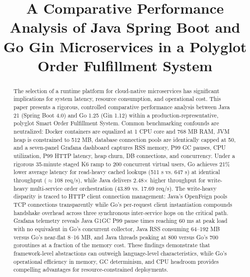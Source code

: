 \documentclass[conference]{IEEEtran}
\begin{document}
\title{A Comparative Performance Analysis of Java Spring Boot and Go Gin Microservices in a Polyglot Order Fulfillment System}

\author{
\and
{}
}

\maketitle

\begin{abstract}
The selection of a runtime platform for cloud-native microservices has significant implications for system latency, resource consumption, and operational cost. This paper presents a rigorous, controlled comparative performance analysis between Java 21 (Spring Boot 4.0) and Go 1.25 (Gin 1.12) within a production-representative, polyglot Smart Order Fulfillment System. Common benchmarking confounds are neutralized: Docker containers are equalized at 1 CPU core and 768 MB RAM, JVM heap is constrained to 512 MB, database connection pools are identically capped at 50, and a seven-panel Grafana dashboard captures RSS memory, P99 GC pauses, CPU utilization, P99 HTTP latency, heap churn, DB connections, and concurrency. Under a rigorous 35-minute staged K6 ramp to 200 concurrent virtual users, Go achieves 21\% lower average latency for read-heavy cached lookups (511 \textmu s vs. 647 \textmu s) at identical throughput ($\approx$108 req/s), while Java delivers 2.48$\times$ higher throughput for write-heavy multi-service order orchestration (43.89 vs. 17.69 req/s). The write-heavy disparity is traced to HTTP client connection management: Java's OpenFeign pools TCP connections transparently while Go's per-request client instantiation compounds handshake overhead across three synchronous inter-service hops on the critical path. Grafana telemetry reveals Java G1GC P99 pause times reaching 60 ms at peak load with no equivalent in Go's concurrent collector, Java RSS consuming 64--192 MB versus Go's near-flat 8--16 MB, and Java threads peaking at 800 versus Go's 700 goroutines at a fraction of the memory cost. These findings demonstrate that framework-level abstractions can outweigh language-level characteristics, while Go's operational efficiency in memory, GC determinism, and CPU headroom provides compelling advantages for resource-constrained deployments.
\end{abstract}
\end{document}
